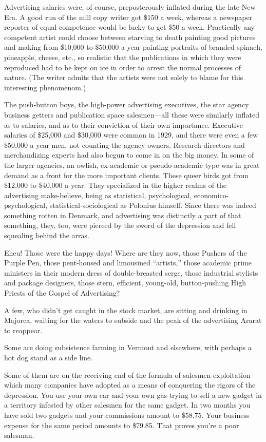 \documentclass[twoside,nohyper,openany,nobib]{tufte-book}
\begin{document}
Advertising salaries were, of course, preposterously inflated during the
late New Era. A good run of the mill copy writer got \$150 a week,
whereas a newspaper reporter of equal competence would be lucky to get
\$50 a week. Practically any competent artist could choose between
starving to death painting good pictures and making from \$10,000 to
\$50,000 a year painting portraits of branded spinach, pineapple,
cheese, etc., so realistic that the publications in which they were
reproduced had to be kept on ice in order to arrest the normal processes
of nature. (The writer admits that the artists were not solely to blame
for this interesting phenomenom.)

The push-button boys, the high-power advertising executives, the star
agency business getters and publication space salesmen---all these were
similarly inflated as to salaries, and as to their conviction of their
own importance. Executive salaries of \$25,000 and \$30,000 were common
in 1929, and there were even a few \$50,000 a year men, not counting the
agency owners. Research directors and merchandizing experts had also
begun to come in on the big money. In some of the larger agencies, an
owlish, ex-academic or pseudo-academic type was in great demand as a
front for the more important clients. These queer birds got from
\$12,000 to \$40,000 a year. They specialized in the higher realms of
the advertising make-believe, being as statistical, psychological,
economico-psychological, statistical-sociological as Polonius himself.
Since there was indeed something rotten in Denmark, and advertising was
distinctly a part of that something, they, too, were pierced by the
sword of the depression and fell squealing behind the arras.

Eheu! Those were the happy days! Where are they now, those Pushers of
the Purple Pen, those pent-housed and limousined ``artists,'' those
academic prime ministers in their modern dress of double-breasted serge,
those industrial stylists and package designers, those stern, efficient,
young-old, button-pushing High Priests of the Gospel of Advertising?

A few, who didn't get caught in the stock market, are sitting and
drinking in Majorca, waiting for the waters to subside and the peak of
the advertising Ararat to reappear.

Some are doing subsistence farming in Vermont and elsewhere, with
perhaps a hot dog stand as a side line.

Some of them are on the receiving end of the formula of
salesmen-exploitation which many companies have adopted as a means of
conquering the rigors of the depression. You use your own car and your
own gas trying to sell a new gadget in a territory infested by other
salesmen for the same gadget. In two months you have sold two gadgets
and your commissions amount to \$58.75. Your business expense for the
same period amounts to \$79.85. That proves you're a poor salesman.
\end{document}

